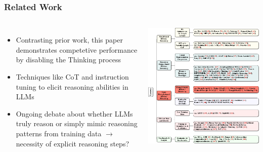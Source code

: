 \documentclass[student, noshadow, lsr, english, aspectratio=169]{ITR_LSR_slides}
\begin{document}
\begin{frame}
    \frametitle{Related Work}
    \begin{columns}
        \begin{itemize}
            \item Contrasting prior work, this paper demonstrates competetive performance by disabling the Thinking process
            \item Techniques like CoT and instruction tuning to elicit reasoning abilities in LLMs \cite{huang_towards_2023,ott_thoughtsource_2023,xu_towards_2025}
            \item Ongoing debate about whether LLMs truly reason or simply mimic reasoning patterns from training data \cite{hochlehnert_sober_2025, xu_towards_2025} \newline $\rightarrow$ necessity of explicit reasoning steps?
        \end{itemize}

        \centering
        \includegraphics[width=\textwidth]{taxonomy.pdf}
    \end{columns}
\end{frame}
\end{document}
